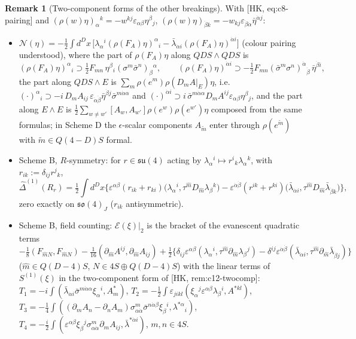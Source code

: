 \documentclass[11pt]{article}
\theoremstyle{definition}
\newtheorem{remark}[definition]{Remark}
\numberwithin{equation}{section}
\begin{document}
\begin{remark}[Two-component forms of the other breakings]
\label{rem:ws2}
With [HK, eq:c8-pairing] and $(\rho(w)\eta)_\alpha{}^k=-w^{kj}\varepsilon_{\alpha\beta}\eta^\beta{}_j$, $(\rho(w)\eta)_{\dot\beta k}=-w_{kj}\varepsilon_{\dot\beta\dot\alpha}\bar\eta^{\dot\alpha j}$:
\begin{itemize}
\item $\mathcal N(\eta)=-\frac12\int d^Dx\,\big[\lambda_\alpha{}^i(\rho(F_A)\eta)^\alpha{}_i-\bar\lambda_{\dot\alpha i}(\rho(F_A)\eta)^{\dot\alpha i}\big]$ (colour pairing understood), where the part of $\rho(F_A)\eta$ along $QDS\wedge QDS$ is
\[
(\rho(F_A)\eta)^\alpha{}_i\supset\tfrac12F_{mn}\,\eta^\beta{}_i(\sigma^m\bar\sigma^n)_\beta{}^\alpha,\qquad (\rho(F_A)\eta)^{\dot\alpha i}\supset-\tfrac12F_{mn}(\bar\sigma^m\sigma^n)^{\dot\alpha}{}_{\dot\beta}\,\bar\eta^{\dot\beta i},
\]
the part along $QDS\wedge E$ is $\sum_m\rho(e^m)\rho(D_mA|_E)\eta$, i.e. $(\cdot)^\alpha{}_i\supset-i\,D_mA_{ij}\,\varepsilon_{\dot\alpha\dot\beta}\bar\eta^{\dot\beta j}\bar\sigma^{m\dot\alpha\alpha}$ and $(\cdot)^{\dot\alpha i}\supset i\,\bar\sigma^{m\dot\alpha\alpha}D_mA^{ij}\varepsilon_{\alpha\beta}\eta^\beta{}_j$, and the part along $E\wedge E$ is $\frac12\sum_{w\neq w'}[A_w,A_{w'}]\rho(e^w)\rho(e^{w'})\eta$ composed from the same formulas; in Scheme D the $\epsilon$-scalar components $A_{\tilde m}$ enter through $\rho(e^{\tilde m})$ with $\tilde m\in Q(4{-}D)S$ formal.
\item Scheme B, $R$-symmetry: for $r\in\mathfrak{su}(4)$ acting by $\lambda_\alpha{}^i\mapsto r^i{}_k\lambda_\alpha{}^k$, with $r_{ik}:=\delta_{ij}r^j{}_k$,
\[
\widehat\Delta^{(1)}(R_r)=\tfrac12\int d^Dx\Big\{\varepsilon^{\alpha\beta}(r_{ik}+r_{ki})\big(\lambda_\alpha{}^i,\tau^{\hat m}D_{\hat m}\lambda_\beta{}^k\big)-\varepsilon^{\dot\alpha\dot\beta}(r^{ik}+r^{ki})\big(\bar\lambda_{\dot\alpha i},\tau^{\hat m}D_{\hat m}\bar\lambda_{\dot\beta k}\big)\Big\},
\]
zero exactly on $\mathfrak{so}(4)_J$ ($r_{ik}$ antisymmetric).
\item Scheme B, field counting: $\mathcal E(\xi)|_2$ is the bracket of the evanescent quadratic terms $-\frac18(F_{\hat mN},F_{\hat mN})-\frac1{16}(\partial_{\hat m}A^{ij},\partial_{\hat m}A_{ij})+\frac12\{\delta_{ij}\varepsilon^{\alpha\beta}(\lambda_\alpha{}^i,\tau^{\hat m}\partial_{\hat m}\lambda_\beta{}^j)-\delta^{ij}\varepsilon^{\dot\alpha\dot\beta}(\bar\lambda_{\dot\alpha i},\tau^{\hat m}\partial_{\hat m}\bar\lambda_{\dot\beta j})\}$ ($\hat m\in Q(D{-}4)S$, $N\in4S\oplus Q(D{-}4)S$) with the linear terms of $S^{(1)}(\xi)$ in the two-component form of [HK, rem:c12-twocomp]: $T_1=-i\int(\bar\lambda_{\dot\alpha i}\bar\sigma^{m\dot\alpha\alpha}\xi_\alpha{}^i,A^*_m)$, $T_2=-\frac12\int\varepsilon_{jikl}(\xi_\alpha{}^j\varepsilon^{\alpha\beta}\lambda_\beta{}^i,A^{*kl})$, $T_3=-\frac14\int((\partial_mA_n-\partial_nA_m)\sigma^m_{\alpha\dot\alpha}\bar\sigma^{n\dot\alpha\beta}\xi_\beta{}^i,\lambda^{*\alpha}{}_i)$, $T_4=-\frac i2\int(\varepsilon^{\alpha\beta}\xi_\beta{}^j\sigma^m_{\alpha\dot\alpha}\partial_mA_{ij},\bar\lambda^{*\dot\alpha i})$, $m,n\in4S$.

\end{itemize}
\end{remark}
\end{document}
